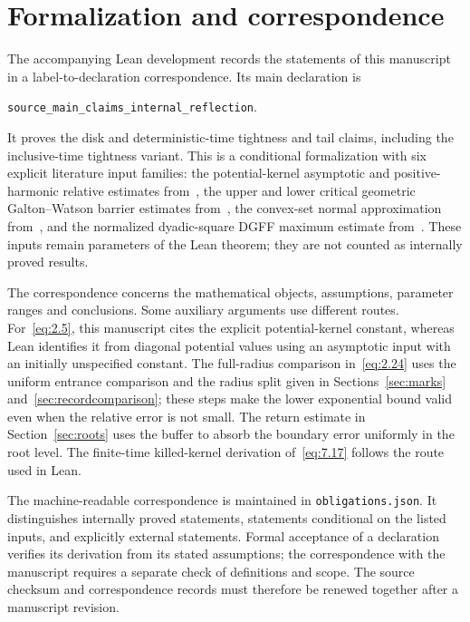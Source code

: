 \documentclass[11pt,letterpaper,reqno]{amsart}
\numberwithin{equation}{section}
\theoremstyle{remark}
\begin{document}
\appendix
\section{Formalization and correspondence}\label{sec:formalization}
The accompanying Lean development records the statements of this manuscript in a label-to-declaration correspondence. Its main declaration is
\begin{center}
\texttt{source\_main\_claims\_internal\_reflection}.
\end{center}
It proves the disk and deterministic-time tightness and tail claims, including the inclusive-time tightness variant. This is a conditional formalization with six explicit literature input families: the potential-kernel asymptotic and positive-harmonic relative estimates from~\cite{LL}, the upper and lower critical geometric Galton--Watson barrier estimates from~\cite{GW}, the convex-set normal approximation from~\cite{BE}, and the normalized dyadic-square DGFF maximum estimate from~\cite{BDZ}. These inputs remain parameters of the Lean theorem; they are not counted as internally proved results.

The correspondence concerns the mathematical objects, assumptions, parameter ranges and conclusions. Some auxiliary arguments use different routes. For~\eqref{eq:2.5}, this manuscript cites the explicit potential-kernel constant, whereas Lean identifies it from diagonal potential values using an asymptotic input with an initially unspecified constant. The full-radius comparison in~\eqref{eq:2.24} uses the uniform entrance comparison and the radius split given in Sections~\ref{sec:marks} and~\ref{sec:recordcomparison}; these steps make the lower exponential bound valid even when the relative error is not small. The return estimate in Section~\ref{sec:roots} uses the buffer to absorb the boundary error uniformly in the root level. The finite-time killed-kernel derivation of~\eqref{eq:7.17} follows the route used in Lean.

The machine-readable correspondence is maintained in \texttt{obligations.json}. It distinguishes internally proved statements, statements conditional on the listed inputs, and explicitly external statements. Formal acceptance of a declaration verifies its derivation from its stated assumptions; the correspondence with the manuscript requires a separate check of definitions and scope. The source checksum and correspondence records must therefore be renewed together after a manuscript revision.
\end{document}
